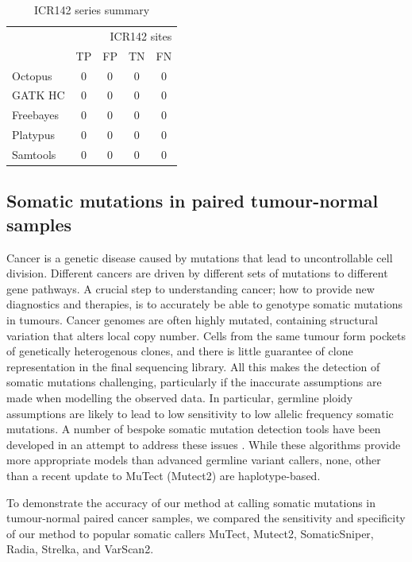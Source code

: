 \documentclass[notitlepage, twocolumn]{article}
\begin{document}
\begin{table}[h]
\centering
\caption{ICR142 series summary}
\begin{tabular}{lcccc}
\hline
\multicolumn{5}{r}{ICR142 sites} \\
\cline{2-5} & TP & FP & TN & FN \\
\hline
Octopus & 0 & 0 & 0 & 0 \\
GATK HC & 0 & 0 & 0 & 0 \\
Freebayes & 0 & 0 & 0 & 0 \\
Platypus & 0 & 0 & 0 & 0 \\
Samtools & 0 & 0 & 0 & 0 \\
\hline
\end{tabular}
\end{table}

\subsection*{Somatic mutations in paired tumour-normal samples}

Cancer is a genetic disease caused by mutations that lead to uncontrollable cell division. Different cancers are driven by different sets of mutations to different gene pathways. A crucial step to understanding cancer; how to provide new diagnostics and therapies, is to accurately be able to genotype somatic mutations in tumours. Cancer genomes are often highly mutated, containing structural variation that alters local copy number. Cells from the same tumour form pockets of genetically heterogenous clones, and there is little guarantee of clone representation in the final sequencing library. All this makes the detection of somatic mutations challenging, particularly if the inaccurate assumptions are made when modelling the observed data. In particular, germline ploidy assumptions are likely to lead to low sensitivity to low allelic frequency somatic mutations. A number of bespoke somatic mutation detection tools have been developed in an attempt to address these issues \cite{mutect, somaticsniper, radia, strelka, varscan2}. While these algorithms provide more appropriate models than advanced germline variant callers, none, other than a recent update to MuTect (Mutect2) are haplotype-based.

To demonstrate the accuracy of our method at calling somatic mutations in tumour-normal paired cancer samples, we compared the sensitivity and specificity of our method to popular somatic callers MuTect, Mutect2, SomaticSniper, Radia, Strelka, and VarScan2.
\end{document}
